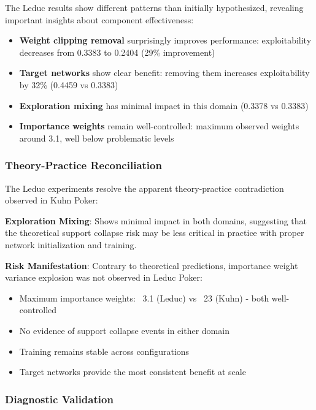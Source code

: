 \documentclass[12pt,a4paper]{article}
\begin{document}
The Leduc results show different patterns than initially hypothesized, revealing important insights about component effectiveness:

\begin{itemize}
\item \textbf{Weight clipping removal} surprisingly improves performance: exploitability decreases from 0.3383 to 0.2404 (29\% improvement)
\item \textbf{Target networks} show clear benefit: removing them increases exploitability by 32\% (0.4459 vs 0.3383)
\item \textbf{Exploration mixing} has minimal impact in this domain (0.3378 vs 0.3383)
\item \textbf{Importance weights} remain well-controlled: maximum observed weights around 3.1, well below problematic levels
\end{itemize}

\subsubsection{Theory-Practice Reconciliation}

The Leduc experiments resolve the apparent theory-practice contradiction observed in Kuhn Poker:

\textbf{Exploration Mixing}: Shows minimal impact in both domains, suggesting that the theoretical support collapse risk may be less critical in practice with proper network initialization and training.

\textbf{Risk Manifestation}: Contrary to theoretical predictions, importance weight variance explosion was not observed in Leduc Poker:
\begin{itemize}
\item Maximum importance weights: ~3.1 (Leduc) vs ~23 (Kuhn) - both well-controlled
\item No evidence of support collapse events in either domain
\item Training remains stable across configurations
\item Target networks provide the most consistent benefit at scale
\end{itemize}

\subsubsection{Diagnostic Validation}
\end{document}
